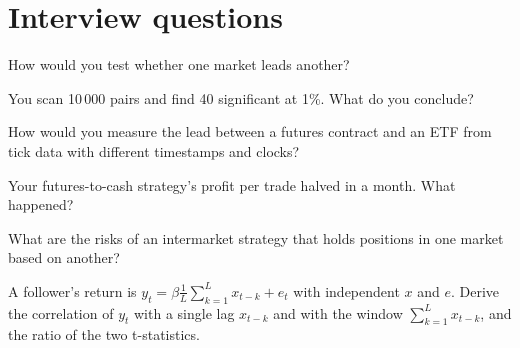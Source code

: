 \section{Interview questions}

\begin{interviewq}\label{iq:s1:cross-asset-lead-lag:1}
How would you test whether one market leads another?
\end{interviewq}

\begin{interviewq}\label{iq:s1:cross-asset-lead-lag:2}
You scan 10\,000 pairs and find 40 significant at 1\%. What do you conclude?
\end{interviewq}

\begin{interviewq}\label{iq:s1:cross-asset-lead-lag:3}
How would you measure the lead between a futures contract and an ETF from tick data with different timestamps and clocks?
\end{interviewq}

\begin{interviewq}\label{iq:s1:cross-asset-lead-lag:4}
Your futures-to-cash strategy's profit per trade halved in a month. What happened?
\end{interviewq}

\begin{interviewq}\label{iq:s1:cross-asset-lead-lag:5}
What are the risks of an intermarket strategy that holds positions in one market based on another?
\end{interviewq}

\begin{interviewq}\label{iq:s1:cross-asset-lead-lag:6}
A follower's return is $y_t = \beta \frac{1}{L}\sum_{k=1}^{L} x_{t-k} + e_t$ with independent $x$ and $e$. Derive the correlation of $y_t$ with a single lag
$x_{t-k}$ and with the window $\sum_{k=1}^{L} x_{t-k}$, and the ratio of the two t-statistics.
\end{interviewq}
